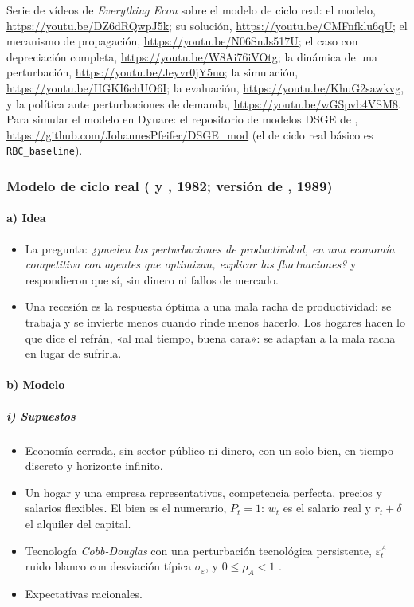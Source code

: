 \documentclass[11pt]{article}
\begin{document}
\begin{anotaciones}
Serie de vídeos de \emph{Everything Econ} sobre el modelo de ciclo real: el modelo, \url{https://youtu.be/DZ6dRQwpJ5k}; su solución, \url{https://youtu.be/CMFnfklu6qU}; el mecanismo de propagación, \url{https://youtu.be/N06SnJs517U}; el caso con depreciación completa, \url{https://youtu.be/W8Ai76iVOtg}; la dinámica de una perturbación, \url{https://youtu.be/Jeyvr0jY5uo}; la simulación, \url{https://youtu.be/HGKI6chUO6I}; la evaluación, \url{https://youtu.be/KhuG2sawkvg}, y la política ante perturbaciones de demanda, \url{https://youtu.be/wGSpvb4VSM8}. Para simular el modelo en Dynare: el repositorio de modelos DSGE de , \url{https://github.com/JohannesPfeifer/DSGE_mod} (el de ciclo real básico es \texttt{RBC\_baseline}).
\end{anotaciones}

\subsubsection{Modelo de ciclo real ( y , 1982; versión de , 1989)}\label{sec:rbc}

\paragraph{a) Idea}

\begin{itemize}
\item La pregunta: \emph{¿pueden las perturbaciones de productividad, en una economía competitiva con agentes que optimizan, explicar las fluctuaciones?} \textcite{KydlandPrescott1982Time} y \textcite{LongPlosser1983Real} respondieron que sí, sin dinero ni fallos de mercado.
\item Una recesión es la respuesta óptima a una mala racha de productividad: se trabaja y se invierte menos cuando rinde menos hacerlo. Los hogares hacen lo que dice el refrán, «al mal tiempo, buena cara»: se adaptan a la mala racha en lugar de sufrirla.
\end{itemize}

\paragraph{b) Modelo}

\subparagraph{i) Supuestos}

\begin{itemize}
\item Economía cerrada, sin sector público ni dinero, con un solo bien, en tiempo discreto y horizonte infinito.
\item Un hogar y una empresa representativos, competencia perfecta, precios y salarios flexibles. El bien es el numerario, $P_t=1$: $w_t$ es el salario real y $r_t+\delta$ el alquiler del capital.
\item Tecnología \emph{Cobb-Douglas} con una perturbación tecnológica persistente, $\varepsilon^A_t$ ruido blanco con desviación típica $\sigma_\varepsilon$, y $0\le\rho_A<1$ .
\item Expectativas racionales.
\end{itemize}
\end{document}
